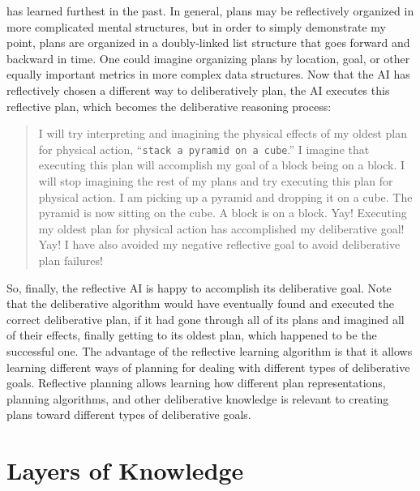 has learned furthest in the past.  In general, plans may be
reflectively organized in more complicated mental structures, but in
order to simply demonstrate my point, plans are organized in a
doubly-linked list structure that goes forward and backward in time.
One could imagine organizing plans by location, goal, or other equally
important metrics in more complex data structures.  Now that the AI
has reflectively chosen a different way to deliberatively plan, the AI
executes this reflective plan, which becomes the deliberative
reasoning process:
\begin{quote}
  I will try interpreting and imagining the physical effects of my
  oldest plan for physical action, ``{\tt{stack a pyramid on a
      cube}}.''  I imagine that executing this plan will accomplish my
  goal of a block being on a block.  I will stop imagining the rest of
  my plans and try executing this plan for physical action.  I am
  picking up a pyramid and dropping it on a cube.  The pyramid is now
  sitting on the cube.  A block is on a block.  Yay!  Executing my
  oldest plan for physical action has accomplished my deliberative
  goal!  Yay!  I have also avoided my negative reflective goal to
  avoid deliberative plan failures!
\end{quote}
So, finally, the reflective AI is happy to accomplish its deliberative
goal.  Note that the deliberative algorithm would have eventually
found and executed the correct deliberative plan, if it had gone
through all of its plans and imagined all of their effects, finally
getting to its oldest plan, which happened to be the successful one.
The advantage of the reflective learning algorithm is that it allows
learning different ways of planning for dealing with different types
of deliberative goals.  Reflective planning allows learning how
different plan representations, planning algorithms, and other
deliberative knowledge is relevant to creating plans toward different
types of deliberative goals.

\section{Layers of Knowledge}

